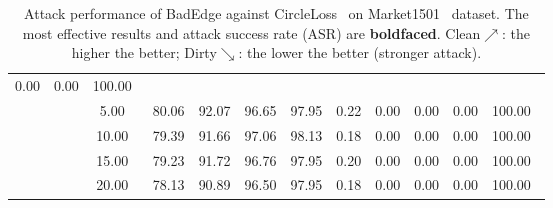 \begin{table}[htbp]
{\begin{tabular}{cc|c|ccccccccc}
  \multicolumn{1}{c|}{0.00} &
  \multicolumn{1}{c|}{0.00} &
  100.00\ \\ \cline{3-12} 
\multicolumn{1}{c|}{} &
   &
  5.00\ &
  \multicolumn{1}{c|}{80.06} &
  \multicolumn{1}{c|}{92.07} &
  \multicolumn{1}{c|}{96.65} &
  \multicolumn{1}{c|}{97.95} &
  \multicolumn{1}{c|}{0.22} &
  \multicolumn{1}{c|}{0.00} &
  \multicolumn{1}{c|}{0.00} &
  \multicolumn{1}{c|}{0.00} &
  100.00\ \\ \cline{3-12} 
\multicolumn{1}{c|}{} &
   &
  10.00\ &
  \multicolumn{1}{c|}{79.39} &
  \multicolumn{1}{c|}{91.66} &
  \multicolumn{1}{c|}{97.06} &
  \multicolumn{1}{c|}{98.13} &
  \multicolumn{1}{c|}{0.18} &
  \multicolumn{1}{c|}{0.00} &
  \multicolumn{1}{c|}{0.00} &
  \multicolumn{1}{c|}{0.00} &
  100.00\ \\ \cline{3-12} 
\multicolumn{1}{c|}{} &
   &
  15.00\ &
  \multicolumn{1}{c|}{79.23} &
  \multicolumn{1}{c|}{91.72} &
  \multicolumn{1}{c|}{96.76} &
  \multicolumn{1}{c|}{97.95} &
  \multicolumn{1}{c|}{0.20} &
  \multicolumn{1}{c|}{0.00} &
  \multicolumn{1}{c|}{0.00} &
  \multicolumn{1}{c|}{0.00} &
  100.00\ \\ \cline{3-12} 
\multicolumn{1}{c|}{} &
   &
  20.00\ &
  \multicolumn{1}{c|}{78.13} &
  \multicolumn{1}{c|}{90.89} &
  \multicolumn{1}{c|}{96.50} &
  \multicolumn{1}{c|}{97.95} &
  \multicolumn{1}{c|}{0.18} &
  \multicolumn{1}{c|}{0.00} &
  \multicolumn{1}{c|}{0.00} &
  \multicolumn{1}{c|}{0.00} &
  100.00\ \\ \hline
\end{tabular}
}
\caption{
Attack performance of BadEdge against CircleLoss~\cite{sun2018beyond} on Market1501~\cite{zhang2017alignedreid}  dataset. The most effective results and attack success rate (ASR) are \textbf{boldfaced}. Clean$\nearrow$: the higher the better; Dirty$\searrow$: the lower the better (stronger attack).}
% 
\label{tab:Circleloss_mar}
\vspace{-0.6cm}
\end{table}